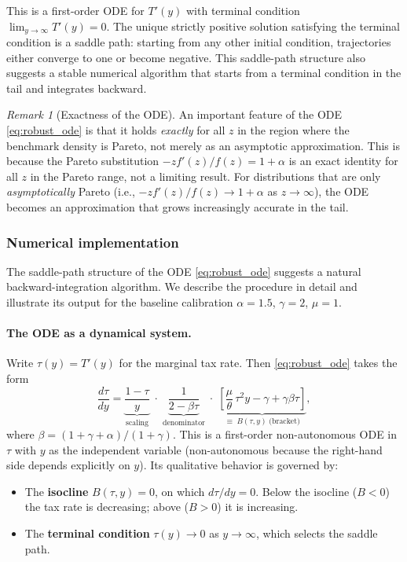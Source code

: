 \documentclass[12pt,a4paper]{article}
\theoremstyle{definition}
\theoremstyle{plain}
\theoremstyle{remark}
\newtheorem{remark}{Remark}[section]
\begin{document}
This is a first-order ODE for $T'(y)$ with terminal condition $\lim_{y \to \infty} T'(y) = 0$. The unique strictly positive solution satisfying the terminal condition is a saddle path: starting from any other initial condition, trajectories either converge to one or become negative. This saddle-path structure also suggests a stable numerical algorithm that starts from a terminal condition in the tail and integrates backward.

\begin{remark}[Exactness of the ODE]
An important feature of the ODE \eqref{eq:robust_ode} is that it holds \emph{exactly} for all $z$ in the region where the benchmark density is Pareto, not merely as an asymptotic approximation. This is because the Pareto substitution $-zf'(z)/f(z) = 1+\alpha$ is an exact identity for all $z$ in the Pareto range, not a limiting result. For distributions that are only \emph{asymptotically} Pareto (i.e., $-zf'(z)/f(z) \to 1+\alpha$ as $z \to \infty$), the ODE becomes an approximation that grows increasingly accurate in the tail.
\end{remark}

\subsubsection{Numerical implementation}

The saddle-path structure of the ODE \eqref{eq:robust_ode} suggests a natural backward-integration algorithm. We describe the procedure in detail and illustrate its output for the baseline calibration $\alpha = 1.5$, $\gamma = 2$, $\mu = 1$.

\paragraph{The ODE as a dynamical system.}
Write $\tau(y) = T'(y)$ for the marginal tax rate. Then \eqref{eq:robust_ode} takes the form
\begin{equation}
\label{eq:robust_ode_compact}
  \frac{d\tau}{dy} = \underbrace{\frac{1-\tau}{y}}_{\text{scaling}} \;\cdot\;
  \underbrace{\frac{1}{2 - \beta\tau}}_{\text{denominator}} \;\cdot\;
  \underbrace{\left[\frac{\mu}{\theta}\,\tau^2 y - \gamma + \gamma\beta\tau\right]}_{\equiv\; B(\tau,y)\;\text{(bracket)}},
\end{equation}
where $\beta = (1+\gamma+\alpha)/(1+\gamma)$. This is a first-order non-autonomous ODE in $\tau$ with $y$ as the independent variable (non-autonomous because the right-hand side depends explicitly on $y$). Its qualitative behavior is governed by:
\begin{itemize}
\item The \textbf{isocline} $B(\tau,y) = 0$, on which $d\tau/dy = 0$. Below the isocline ($B < 0$) the tax rate is decreasing; above ($B > 0$) it is increasing.
\item The \textbf{terminal condition} $\tau(y) \to 0$ as $y \to \infty$, which selects the saddle path.
\end{itemize}
\end{document}
